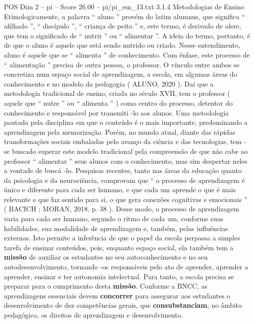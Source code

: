 \begin{textsample}{POS Dim 2 – pi – Score 26.00 – pi/pi\_em\_13.txt}  \label{ex:f2_pos_098}
3.1.4 Metodologias de Ensino Etimologicamente, a palavra “ aluno ” provém do latim alumnus, que significa “ afilhado ”, “ discípulo ”, “ criança de peito ” e, este termo, é derivado de alere, que tem o significado de “ nutrir ” ou “ alimentar ”.
A ideia do termo, portanto, é de que o aluno é aquele que está sendo nutrido ou criado.
Nesse entendimento, aluno é aquele que se “ alimenta ” de conhecimento.
Com ênfase, este processo de “ alimentação ” precisa de outra pessoa, o professor.
O vínculo entre ambos se concretiza num espaço social de aprendizagem, a escola, em algumas áreas do conhecimento e no modelo da pedagogia ( ALUNO, 2020 ).
Daí que a metodologia tradicional de ensino, criada no século XVII, tem o professor ( aquele que “ nutre ” ou “ alimenta ” ) como centro do processo, detentor do conhecimento e responsável por transmiti -lo aos alunos.
Uma metodologia pautada pela disciplina em que o conteúdo é o mais importante, predominando a aprendizagem pela memorização.
Porém, no mundo atual, diante das rápidas transformações sociais embaladas pelo avanço da ciência e das tecnologias, tem -se buscado superar este modelo tradicional pela compreensão de que não cabe ao professor “ alimentar ” seus alunos com o conhecimento, mas sim despertar neles a vontade de buscá -lo.
Pesquisas recentes, tanto nas áreas da educação quanto da psicologia e da neurociência, comprovam que “ o processo de aprendizagem é único e diferente para cada ser humano, e que cada um aprende o que é mais relevante e que faz sentido para si, o que gera conexões cognitivas e emocionais ” ( BACICH ; MORAN, 2018, p. 38 ).
Desse modo, o processo de aprendizagem varia para cada ser humano, segundo o ritmo de cada um, conforme suas habilidades, sua modalidade de aprendizagem e, também, pelas influências externas.
Isto permite a inferência de que o papel da escola perpassa a simples tarefa de ensinar conteúdos, pois, enquanto espaço social, ela também tem a \textbf{missão} de auxiliar os estudantes no seu autoconhecimento e no seu autodesenvolvimento, tornando -os responsáveis pelo ato de aprender, aprender a aprender, ensinar e ter autonomia intelectual.
Para tanto, a escola precisa se preparar para o cumprimento desta \textbf{missão}.
Conforme a BNCC, as aprendizagens essenciais devem \textbf{concorrer} para assegurar aos estudantes o desenvolvimento de dez competências gerais, que \textbf{consubstanciam}, no âmbito pedagógico, os direitos de aprendizagem e desenvolvimento.

\end{textsample}
